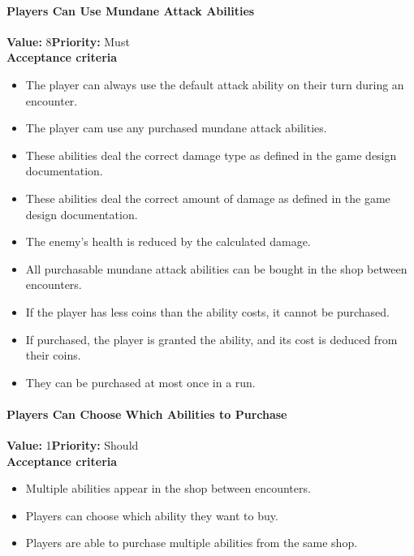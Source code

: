 \paragraph{Players Can Use Mundane Attack Abilities}
\textbf{Value:} 8\quad \textbf{Priority:} Must\\
\textbf{Acceptance criteria}
\begin{itemize}
  \item The player can always use the default attack ability on their turn during an encounter.
  \item The player cam use any purchased mundane attack abilities.
  \item These abilities deal the correct damage type as defined in the game design documentation.
  \item These abilities deal the correct amount of damage as defined in the game design documentation.
  \item The enemy's health is reduced by the calculated damage.
  \item All purchasable mundane attack abilities can be bought in the shop between encounters.
  \item If the player has less coins than the ability costs, it cannot be purchased.
  \item If purchased, the player is granted the ability, and its cost is deduced from their coins.
  \item They can be purchased at most once in a run.
\end{itemize}

\paragraph{Players Can Choose Which Abilities to Purchase}
\textbf{Value:} 1\quad \textbf{Priority:} Should\\
\textbf{Acceptance criteria}
\begin{itemize}
  \item Multiple abilities appear in the shop between encounters.
  \item Players can choose which ability they want to buy.
  \item Players are able to purchase multiple abilities from the same shop.
\end{itemize}

